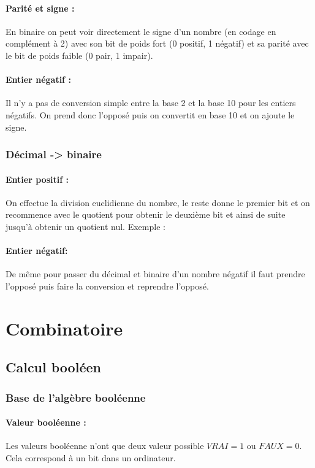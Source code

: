 \documentclass[10pt,a4paper,twoside]{article}
\begin{document}
\paragraph{Parité et signe :} En binaire on peut voir directement le signe d'un nombre (en codage en complément à 2) avec son bit de poids fort (0 positif, 1 négatif) et sa parité avec le bit de poids faible (0 pair, 1 impair).

\paragraph{Entier négatif :} Il n'y a pas de conversion simple entre la base 2 et la base 10 pour les entiers négatifs. On prend donc l'opposé puis on convertit en base 10 et on ajoute le signe.

\subsubsection{Décimal -> binaire}
\paragraph{Entier positif :} On effectue la division euclidienne du nombre, le reste donne le premier bit et on recommence avec le quotient pour obtenir le deuxième bit et ainsi de suite jusqu'à obtenir un quotient nul. Exemple : \\
 
\paragraph{Entier négatif:} De même pour passer du décimal et binaire d'un nombre négatif il faut prendre l'opposé puis faire la conversion et reprendre l'opposé.

\newpage
\section{Combinatoire}

\subsection{Calcul booléen}
\subsubsection{Base de l'algèbre booléenne}
\paragraph{Valeur booléenne :} Les valeurs booléenne n'ont que deux valeur possible $VRAI=1$ ou $FAUX=0$. Cela correspond à un bit dans un ordinateur.
\end{document}
